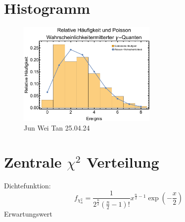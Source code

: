 \documentclass[prb,12pt]{revtex4-2}
\theoremstyle{definition}
\theoremstyle{definition}
\begin{document}
\section{Histogramm}
\begin{figure}[h]
	\includegraphics[width=0.6\textwidth]{fig1.pdf}
	\caption{Jun Wei Tan 25.04.24}
\end{figure}

\section{Zentrale $\chi^2$ Verteilung}
Dichtefunktion:
\[f_{\chi^2_n}=\frac{1}{2^{\frac n2}\left(\frac n2-1\right)!}x^{\frac n2 - 1}\exp\left(-\frac x2\right)\]
Erwartungswert
\end{document}
